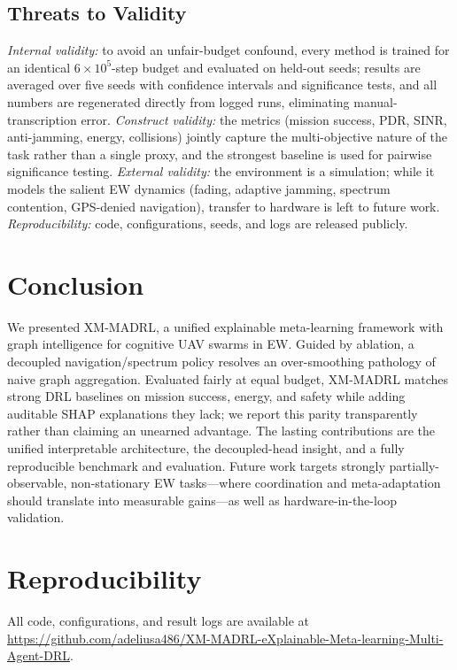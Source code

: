 \documentclass[journal]{IEEEtran}
\begin{document}
\subsection{Threats to Validity}
\emph{Internal validity:} to avoid an unfair-budget confound, every method is
trained for an identical $6\times10^5$-step budget and evaluated on held-out
seeds; results are averaged over five seeds with confidence intervals and
significance tests, and all numbers are regenerated directly from logged runs,
eliminating manual-transcription error. \emph{Construct validity:} the metrics
(mission success, PDR, SINR, anti-jamming, energy, collisions) jointly capture
the multi-objective nature of the task rather than a single proxy, and the
strongest baseline is used for pairwise significance testing. \emph{External
validity:} the environment is a simulation; while it models the salient EW
dynamics (fading, adaptive jamming, spectrum contention, GPS-denied navigation),
transfer to hardware is left to future work. \emph{Reproducibility:} code,
configurations, seeds, and logs are released publicly.

\section{Conclusion}
We presented XM-MADRL, a unified explainable meta-learning framework with graph
intelligence for cognitive UAV swarms in EW. Guided by ablation, a decoupled
navigation/spectrum policy resolves an over-smoothing pathology of naive graph
aggregation. Evaluated fairly at equal budget, XM-MADRL matches strong DRL
baselines on mission success, energy, and safety while adding auditable SHAP
explanations they lack; we report this parity transparently rather than claiming
an unearned advantage. The lasting contributions are the unified interpretable
architecture, the decoupled-head insight, and a fully reproducible benchmark and
evaluation. Future work targets strongly partially-observable, non-stationary EW
tasks---where coordination and meta-adaptation should translate into measurable
gains---as well as hardware-in-the-loop validation.

\section*{Reproducibility}
All code, configurations, and result logs are available at
\url{https://github.com/adeliusa486/XM-MADRL-eXplainable-Meta-learning-Multi-Agent-DRL}.



\end{document}
